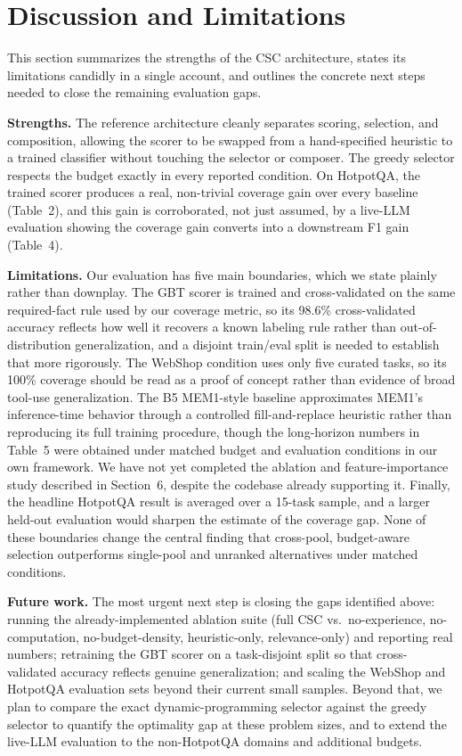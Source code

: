 \documentclass{article}
\begin{document}
\section{Discussion and Limitations}

This section summarizes the strengths of the CSC architecture, states its limitations candidly in a single account, and outlines the concrete next steps needed to close the remaining evaluation gaps.

\textbf{Strengths.} The reference architecture cleanly separates scoring, selection, and composition, allowing the scorer to be swapped from a hand-specified heuristic to a trained classifier without touching the selector or composer. The greedy selector respects the budget exactly in every reported condition. On HotpotQA, the trained scorer produces a real, non-trivial coverage gain over every baseline (Table~2), and this gain is corroborated, not just assumed, by a live-LLM evaluation showing the coverage gain converts into a downstream F1 gain (Table~4).

\textbf{Limitations.} Our evaluation has five main boundaries, which we state plainly rather than downplay. The GBT scorer is trained and cross-validated on the same required-fact rule used by our coverage metric, so its 98.6\% cross-validated accuracy reflects how well it recovers a known labeling rule rather than out-of-distribution generalization, and a disjoint train/eval split is needed to establish that more rigorously. The WebShop condition uses only five curated tasks, so its 100\% coverage should be read as a proof of concept rather than evidence of broad tool-use generalization. The B5 MEM1-style baseline approximates MEM1's inference-time behavior through a controlled fill-and-replace heuristic rather than reproducing its full training procedure, though the long-horizon numbers in Table~5 were obtained under matched budget and evaluation conditions in our own framework. We have not yet completed the ablation and feature-importance study described in Section~6, despite the codebase already supporting it. Finally, the headline HotpotQA result is averaged over a 15-task sample, and a larger held-out evaluation would sharpen the estimate of the coverage gap. None of these boundaries change the central finding that cross-pool, budget-aware selection outperforms single-pool and unranked alternatives under matched conditions.

\textbf{Future work.} The most urgent next step is closing the gaps identified above: running the already-implemented ablation suite (full CSC vs.\ no-experience, no-computation, no-budget-density, heuristic-only, relevance-only) and reporting real numbers; retraining the GBT scorer on a task-disjoint split so that cross-validated accuracy reflects genuine generalization; and scaling the WebShop and HotpotQA evaluation sets beyond their current small samples. Beyond that, we plan to compare the exact dynamic-programming selector against the greedy selector to quantify the optimality gap at these problem sizes, and to extend the live-LLM evaluation to the non-HotpotQA domains and additional budgets.
\end{document}
